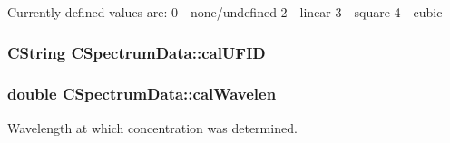 Currently defined values are: 0 -\/ none/undefined 2 -\/ linear 3 -\/ square 4 -\/ cubic \hypertarget{classCSpectrumData_a1fedda1f4c474b8e399bc0390bffab48}{
\subsubsection[{calUFID}]{\setlength{\rightskip}{0pt plus 5cm}CString {\bf CSpectrumData::calUFID}}}
\label{classCSpectrumData_a1fedda1f4c474b8e399bc0390bffab48}
\hypertarget{classCSpectrumData_a0592a6aabad34a9107497426dae8c83c}{
\subsubsection[{calWavelen}]{\setlength{\rightskip}{0pt plus 5cm}double {\bf CSpectrumData::calWavelen}}}
\label{classCSpectrumData_a0592a6aabad34a9107497426dae8c83c}


Wavelength at which concentration was determined. 

